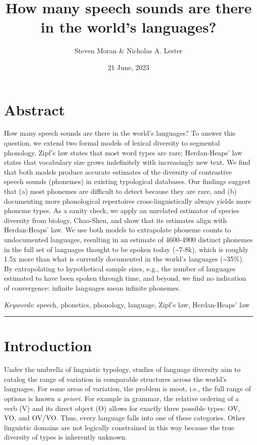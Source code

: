 \documentclass[
]{article}
\title{How many speech sounds are there in the world's languages?}
\author{Steven Moran \& Nicholas A. Lester}
\date{21 June, 2023}
\begin{document}
\maketitle

\hypertarget{abstract}{%
\section*{Abstract}\label{abstract}}

How many speech sounds are there in the world's languages? To answer
this question, we extend two formal models of lexical diversity to
segmental phonology. Zipf's law states that most word types are rare;
Herdan-Heaps' law states that vocabulary size grows indefinitely with
increasingly new text. We find that both models produce accurate
estimates of the diversity of contrastive speech sounds (phonemes) in
existing typological databases. Our findings suggest that (a) most
phonemes are difficult to detect because they are rare, and (b)
documenting more phonological repertoires cross-linguistically always
yields more phoneme types. As a sanity check, we apply an unrelated
estimator of species diversity from biology, Chao-Shen, and show that
its estimates align with Herdan-Heaps' law. We use both models to
extrapolate phoneme counts to undocumented languages, resulting in an
estimate of 4600-4900 distinct phonemes in the full set of languages
thought to be spoken today (\textasciitilde7-8k), which is roughly 1.5x
more than what is currently documented in the world's languages
(\textasciitilde35\%). By extrapolating to hypothetical sample sizes,
e.g., the number of languages estimated to have been spoken through
time, and beyond, we find no indication of convergence: infinite
languages mean infinite phonemes.

\emph{Keywords}: speech, phonetics, phonology, language, Zipf's law,
Herdan-Heaps' law

\begin{center}\rule{0.5\linewidth}{0.5pt}\end{center}

\hypertarget{introduction}{%
\section{Introduction}\label{introduction}}

Under the umbrella of linguistic typology, studies of language diversity
aim to catalog the range of variation in comparable structures across
the world's languages. For some areas of variation, the problem is moot,
i.e., the full range of options is known \emph{a priori}. For example in
grammar, the relative ordering of a verb (V) and its direct object (O)
allows for exactly three possible types: OV, VO, and OV/VO. Thus, every
language falls into one of these categories. Other linguistic domains
are not logically constrained in this way because the true diversity of
types is inherently unknown.
\end{document}
